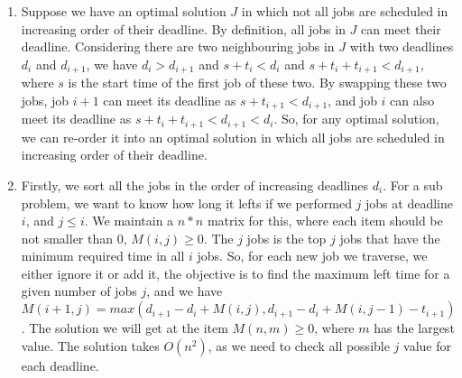 \documentclass[paper=a4, fontsize=11pt]{scrartcl} %
\numberwithin{equation}{section} %
\numberwithin{figure}{section} %
\numberwithin{table}{section} %
\newcommand{\nop}[1]{}
\begin{document}
\begin{enumerate}[label={(\alph*)}]

\item

Suppose we have an optimal solution $J$ in which not all jobs are scheduled in increasing order of their deadline. By definition, all jobs in $J$ can meet their deadline. Considering there are two neighbouring jobs in $J$ with two deadlines $d_i$ and $d_{i+1}$, we have $d_i > d_{i+1}$ and $s+t_i < d_i$ and $s+t_i+t_{i+1} < d_{i+1}$, where $s$ is the start time of the first job of these two. By swapping these two jobs, job $i+1$ can meet its deadline as $s+t_{i+1} < d_{i+1}$, and job $i$ can also meet its deadline as $s+t_i+t_{i+1} < d_{i+1} < d_i$. So, for any optimal solution, we can re-order it into an optimal solution in which all jobs are scheduled in increasing order of their deadline. 

\item
\nop{
Firstly, we sort all the jobs according to their required time $t_i$, such that we can check the order of job $i$. It takes us $O(nlogn)$. 
}
Firstly, we sort all the jobs in the order of increasing deadlines $d_i$. For a sub problem, we want to know how long it lefts if we performed $j$ jobs at deadline $i$, and $j \leq i$. We maintain a $n*n$ matrix for this, where each item should be not smaller than $0$, $M(i, j) \geq 0$. The $j$ jobs is the top $j$ jobs that have the minimum required time in all $i$ jobs. So, for each new job we traverse, we either ignore it or add it, the objective is to find the maximum left time for a given number of jobs $j$, and we have $M(i+1, j) = max(d_{i+1} - d_i + M(i, j), d_{i+1} - d_i + M(i, j -1) - t_{i+1})$. The solution we will get at the item $M(n, m) \geq 0$, where $m$ has the largest value. The solution takes $O(n^2)$, as we need to check all possible $j$ value for each deadline. 

\end{enumerate}
\end{document}
